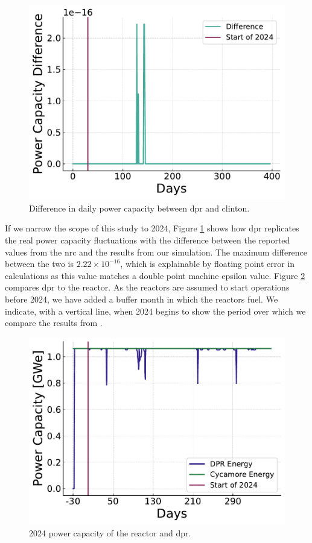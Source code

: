 \begin{figure}[H]
  \centering
  \includegraphics[width=0.7\linewidth]{images/power_reactor/dpr_diff.pdf}
  \caption{Difference in daily power capacity between \gls{dpr} and \gls{clinton}.}
  \label{fig:dpr_clinton_diff}
\end{figure}


If we narrow the scope of this study to 2024, Figure \ref{fig:dpr_clinton_diff}
shows how \gls{dpr} replicates the real power capacity fluctuations with the
difference between the reported values from the \gls{nrc} \cite{nrc_power_2025}
and the results from our \cyclus simulation. The maximum difference between the
two is $2.22 \times 10^{-16}$, which is explainable by floating point error in
calculations as this value matches a double point machine epsilon value. Figure
\ref{fig:dpr_cycamore_power} compares \gls{dpr} to the \cycamore reactor. As
the reactors are assumed to start operations before 2024, we have added a
buffer month in which the reactors fuel. We indicate, with a vertical line,
when 2024 begins to show the period over which we compare the results from
\cyclus.


\begin{figure}[H]
  \centering
  \includegraphics[width=0.7\linewidth]{images/power_reactor/dpr_cycamore_energy.pdf}
  \caption{2024 power capacity of the \cycamore reactor and \gls{dpr}.}
  \label{fig:dpr_cycamore_power}
\end{figure}



